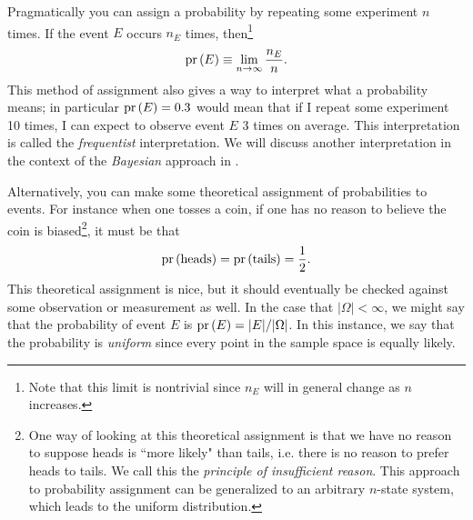 Pragmatically you can assign a probability by repeating some experiment $n$
times. If the event $E$ occurs $n_E$ times, then\footnote{Note that this limit 
is nontrivial since $n_E$ will in general change as $n$ increases.}
\begin{equation}\label{eq:freqdef}
  \operatorname{pr}\left(E\right)\equiv\lim_{n\to\infty}\frac{n_E}{n}.
\end{equation}
This method of assignment also gives a way to interpret
what a probability means; in particular $\operatorname{pr}\left(E\right)=0.3$ would mean that
if I repeat some experiment 10 times, I can expect to observe event
$E$ 3 times on average. This interpretation is called
the {\it frequentist} interpretation. We will
discuss another interpretation in the context of the 
{\it Bayesian} approach in
.
 
Alternatively, you can make some theoretical assignment of probabilities to
events. For instance when one tosses a coin, if one has no reason to believe the
coin is biased\footnote{One way of looking at this theoretical assignment
is that we have no reason to suppose heads is ``more likely" than tails,
i.e. there is no reason to prefer heads to tails. 
We call this the {\it principle of insufficient reason}.
This approach to probability
assignment can be generalized to an arbitrary $n$-state system, which leads
to the uniform distribution.}, it must be that
\begin{equation}
\operatorname{pr}\left(\text{heads}\right)=\operatorname{pr}\left(\text{tails}\right)=\frac{1}{2}.
\end{equation}
This theoretical assignment is nice, but it should eventually be checked against
some observation or measurement as well.
In the case that $|\Omega|<\infty$,
we might say that the probability of event $E$ is $\operatorname{pr}\left(E\right)=|E|/|\Omega|$. In
this instance, we say that the probability is {\it uniform}
 since every point in the sample space is equally likely. 


